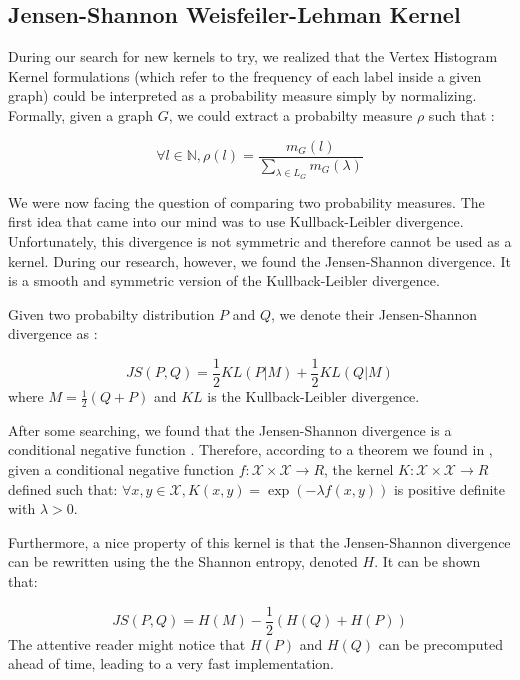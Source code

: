 \documentclass{IEEEtran}
\begin{document}
\subsection{Jensen-Shannon Weisfeiler-Lehman Kernel}

During our search for new kernels to try, we realized that the Vertex Histogram Kernel formulations (which refer to the frequency of each label inside a given graph) could be interpreted as a probability measure simply by normalizing.
Formally, given a graph $G$, we could extract a probabilty measure
$\rho$ such that :

\begin{equation*}
    \forall l \in \mathbb N, \rho (l) = \frac{m_G(l)}{\sum_{\lambda \in L_G}{m_G(\lambda)}}
\end{equation*}

We were now facing the question of comparing two probability measures. The first idea that came into our mind was to use Kullback-Leibler divergence. Unfortunately, this divergence is not symmetric and therefore cannot be used as a kernel. During our research, however, we found the Jensen-Shannon divergence. It is a smooth and symmetric version of the Kullback-Leibler divergence.

Given two probabilty distribution $P$ and $Q$, we denote their
Jensen-Shannon divergence as :

\begin{equation*}
    JS(P, Q) = \frac{1}{2}KL(P|M) + \frac{1}{2}KL(Q|M)
\end{equation*}
where $M = \frac{1}{2} \left( Q + P \right)$ and $KL$ is the Kullback-Leibler divergence.

After some searching, we found that the Jensen-Shannon divergence is a conditional negative function \cite{callut2011sequence}.
Therefore, according to a theorem we found in \cite{callut2011sequence},
given a conditional negative function $ f : \mathcal{X} \times \mathcal{X} \to R$,
the kernel $K : \mathcal{X} \times \mathcal{X} \to R$ defined such that:
$\forall x, y \in \mathcal{X}, K(x, y) = \exp{(- \lambda f(x,y))}$
is positive definite with $\lambda > 0$.

Furthermore, a nice property of this kernel is
that the Jensen-Shannon divergence can be rewritten using the
the Shannon entropy, denoted $H$. It can be shown that:

\begin{equation*}
    JS(P, Q) = H(M) - \frac{1}{2} \left( H(Q) + H(P) \right)
\end{equation*}
The attentive reader might notice that
$H(P)$ and $H(Q)$ can be precomputed ahead of time,
leading to a very fast implementation.
\end{document}
